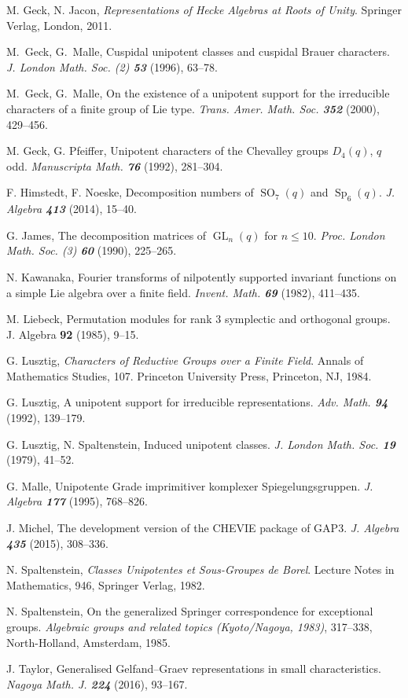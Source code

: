 \documentclass[12pt,leqno,a4paper]{amsart}
\newcommand{\GL}{{\operatorname{GL}}}
\newcommand{\SO}{{\operatorname{SO}}}
\newcommand{\Sp}{{\operatorname{Sp}}}
\theoremstyle{remark}
\begin{document}
\begin{thebibliography}{33}
{\sc M. Geck, N. Jacon}, \emph{Representations of Hecke Algebras at Roots of
  Unity}. Springer Verlag, London, 2011.

{\sc M.~Geck, G.~Malle}, Cuspidal unipotent classes and cuspidal Brauer
  characters. \emph{J. London Math. Soc. (2) \bf53} (1996), 63--78.

{\sc M.~Geck, G.~Malle}, On the existence of a unipotent support for the
  irreducible characters of a finite group of Lie type. \emph{Trans. Amer.
  Math. Soc. \bf352} (2000), 429--456.

{\sc M. Geck, G. Pfeiffer}, Unipotent characters of the Chevalley groups
  $D_4(q)$, $q$ odd. \emph{Manuscripta Math. \bf76} (1992), 281--304.

{\sc F. Himstedt, F. Noeske}, Decomposition numbers of $\SO_7(q)$ and
  $\Sp_6(q)$. \emph{J. Algebra \bf413} (2014), 15--40.

{\sc G. James}, The decomposition matrices of $\GL_n(q)$ for $n\le 10$.
  \emph{Proc. London Math. Soc. (3) \bf60} (1990), 225--265.

{\sc N. Kawanaka}, Fourier transforms of nilpotently supported invariant
  functions on a simple Lie algebra over a finite field. \emph{Invent. Math.
  \bf69} (1982), 411--435.

{\sc M. Liebeck}, Permutation modules for rank $3$ symplectic and orthogonal
  groups. J. Algebra {\bf92} (1985), 9--15.

{\sc G. Lusztig}, \emph{Characters of Reductive Groups over a Finite Field}.
  Annals of Mathematics Studies, 107. Princeton University Press, Princeton,
  NJ, 1984.

{\sc G. Lusztig}, A unipotent support for irreducible representations.
  \emph{Adv. Math. \bf94} (1992), 139--179.

{\sc G. Lusztig, N. Spaltenstein}, Induced unipotent classes. \emph{J. London
  Math. Soc. \bf19} (1979), 41--52.

{\sc G. Malle}, Unipotente Grade imprimitiver komplexer Spiegelungsgruppen.
  \emph{J. Algebra \bf177} (1995), 768--826.

{\sc J. Michel}, The development version of the CHEVIE package of GAP3.
  \emph{J. Algebra \bf435} (2015), 308--336.

{\sc N. Spaltenstein}, \emph{Classes Unipotentes et Sous-Groupes de Borel}.
  Lecture Notes in Mathematics, 946, Springer Verlag, 1982.

{\sc N. Spaltenstein}, On the generalized Springer correspondence for
  exceptional groups. \emph{Algebraic groups and related topics (Kyoto/Nagoya,
  1983)},  317--338, North-Holland, Amsterdam, 1985.

{\sc J. Taylor}, Generalised Gelfand--Graev representations in small
  characteristics. \emph{Nagoya Math. J. \bf224} (2016), 93--167.

\end{thebibliography}
\end{document}
